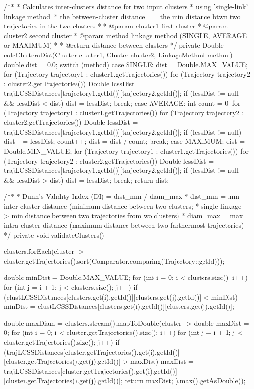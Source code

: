 {    /**
     * Calculates inter-clusters distance for two input clusters
     * using 'single-link' linkage method:
     * the between-cluster distance == the min distance btwn two trajectories in the two clusters
     *
     * @param cluster1 	first cluster
     * @param cluster2 	second cluster
     * @param method	linkage method (SINGLE, AVERAGE or MAXIMUM)
     *
     * @return 			distance between clusters
     */
    private Double calcClustersDist(Cluster cluster1, Cluster cluster2, LinkageMethod method) {
        double dist = 0.0;
		switch (method) { 
			case SINGLE: {
				dist = Double.MAX_VALUE;
				for (Trajectory trajectory1 : cluster1.getTrajectories()) {
					for (Trajectory trajectory2 : cluster2.getTrajectories()) {
						Double lcssDist = trajLCSSDistances[trajectory1.getId()][trajectory2.getId()];
						if (lcssDist != null && lcssDist < dist)
							dist = lcssDist;
					}
				}
				break;
			}
			case AVERAGE: {
				int count = 0;
				for (Trajectory trajectory1 : cluster1.getTrajectories()) {
					for (Trajectory trajectory2 : cluster2.getTrajectories()) {
						Double lcssDist = trajLCSSDistances[trajectory1.getId()][trajectory2.getId()];
						if (lcssDist != null) {
							dist += lcssDist;
							count++;
						}
					}
				}
				dist = dist / count;
				break;
			}
			case MAXIMUM: {
				dist = Double.MIN_VALUE;
				for (Trajectory trajectory1 : cluster1.getTrajectories()) {
					for (Trajectory trajectory2 : cluster2.getTrajectories()) {
						Double lcssDist = trajLCSSDistances[trajectory1.getId()][trajectory2.getId()];
						if (lcssDist != null && lcssDist > dist)
							dist = lcssDist;
					}
				}
				break;
			}
		}
		return dist;
	}

	/**
	* Dunn's Validity Index (DI) = dist_min / diam_max
	* dist_min = min inter-cluster distance (minimum distance between two clusters;
	* single-linkage -> min distance between two trajectories from wo clusters)
	* diam_max = max intra-cluster distance (maximum distance between two farthermost trajectories)
	*/
	private void validateClusters() {
		clusters.forEach(cluster -> cluster.getTrajectories().sort(Comparator.comparing(Trajectory::getId)));
	
		double minDist = Double.MAX_VALUE;
		for (int i = 0; i < clusters.size(); i++) {
			for (int j = i + 1; j < clusters.size(); j++) {
				if (clustLCSSDistances[clusters.get(i).getId()][clusters.get(j).getId()] < minDist)
				minDist = clustLCSSDistances[clusters.get(i).getId()][clusters.get(j).getId()];
			}
		}
	
		double maxDiam = clusters.stream().mapToDouble(cluster -> {
			double maxDist = 0;
			for (int i = 0; i < cluster.getTrajectories().size(); i++) {
				for (int j = i + 1; j < cluster.getTrajectories().size(); j++) {
					if (trajLCSSDistances[cluster.getTrajectories().get(i).getId()][cluster.getTrajectories().get(j).getId()] > maxDist)
					maxDist = trajLCSSDistances[cluster.getTrajectories().get(i).getId()][cluster.getTrajectories().get(j).getId()];
				}
			}
			return maxDist;
		}).max().getAsDouble();
	
}}
